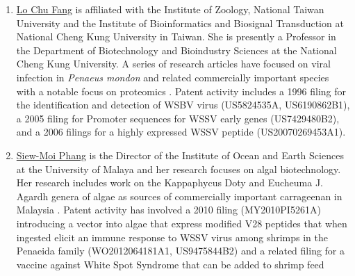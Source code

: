\documentclass[]{book}
\theoremstyle{definition}
\theoremstyle{definition}
\theoremstyle{definition}
\theoremstyle{remark}
\begin{document}
\begin{enumerate}
{  Kumar Pallathadka} is a Professor of Biological Sciences at the
  National University of Singapore with research focusing on plant
  sciences. His research has focused on proteomics in connection with
  the mangrove tree \emph{Avicennia officinalis} to understand salt
  tolerance in mangroves. This has led to the identification of
  Expressed Sequence Tags (ESTs) linked to salt stress tolerance and
  additional work on the role of root hydrophobic barriers in salt
  exclusion
  \citep{Krishnamurthy_2014, Jyothi_Prakash_2014, Krishnamurthy_2014a}.
  Patent activity is not directly linked to this research but includes
  filings from 2007 on a putative cytokinin receptor for modulating the
  expression of traits in plants (EP2124522B1). In a separate area of
  research a family of filings is observed on a novel snake toxin
  (originally filed in 2004 and published as US2009285825A1, SG132985A1
  and WO2006068625A1).
\item
  \href{https://researchoutput.ncku.edu.tw/en/persons/chu-fang-lo}{Lo
  Chu Fang} is affiliated with the Institute of Zoology, National Taiwan
  University and the Institute of Bioinformatics and Biosignal
  Transduction at National Cheng Kung University in Taiwan. She is
  presently a Professor in the Department of Biotechnology and
  Bioindustry Sciences at the National Cheng Kung University. A series
  of research articles have focused on viral infection in \emph{Penaeus
  mondon} and related commercially important species with a notable
  focus on proteomics
  \citep{Suraprasit_2014, Rattanarojpong_2007, Gonnet_2008}. Patent
  activity includes a 1996 filing for the identification and detection
  of WSBV virus (US5824535A, US6190862B1), a 2005 filing for Promoter
  sequences for WSSV early genes (US7429480B2), and a 2006 filings for a
  highly expressed WSSV peptide (US20070269453A1).
\item
  \href{https://umexpert.um.edu.my/phang}{Siew-Moi Phang} is the
  Director of the Institute of Ocean and Earth Sciences at the
  University of Malaya and her research focuses on algal biotechnology.
  Her research includes work on the Kappaphycus Doty and Eucheuma J.
  Agardh genera of algae as sources of commercially important
  carrageenan in Malaysia \citep{Tan_2012}. Patent activity has involved
  a 2010 filing (MY2010PI5261A) introducing a vector into algae that
  express modified V28 peptides that when ingested elicit an immune
  response to WSSV virus among shrimps in the Penaeida family
  (WO2012064181A1, US9475844B2) and a related filing for a vaccine
  against White Spot Syndrome that can be added to shrimp feed

\end{enumerate}
\end{document}
